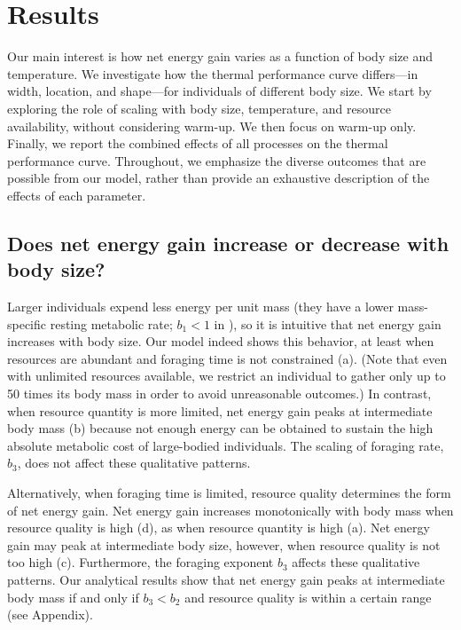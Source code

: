 \section*{Results}

Our main interest is how net energy gain varies as a function of body size and temperature.
We investigate how the thermal performance curve differs---in width, location, and shape---for individuals of different body size.
We start by exploring the role of scaling with body size, temperature, and resource availability, without considering warm-up.
We then focus on warm-up only.
Finally, we report the combined effects of all processes on the thermal performance curve.
Throughout, we emphasize the diverse outcomes that are possible from our model, rather than provide an exhaustive description of the effects of each parameter.


\subsection*{Does net energy gain increase or decrease with body size?}


Larger individuals expend less energy per unit mass (they have a lower mass-specific resting metabolic rate; $b_1 < 1$ in ), so it is intuitive that net energy gain increases with body size.
Our model indeed shows this behavior, at least when resources are abundant and foraging time is not constrained (a).
(Note that even with unlimited resources available, we restrict an individual to gather only up to 50 times its body mass in order to avoid unreasonable outcomes.) %
In contrast, when resource quantity is more limited, net energy gain peaks at intermediate body mass (b) because not enough energy can be obtained to sustain the high absolute metabolic cost of large-bodied individuals.
The scaling of foraging rate, $b_3$, does not affect these qualitative patterns.

Alternatively, when foraging time is limited, resource quality determines the form of net energy gain.
Net energy gain increases monotonically with body mass when resource quality is high (d), as when resource quantity is high (a).
Net energy gain may peak at intermediate body size, however, when resource quality is not too high (c).
Furthermore, the foraging exponent $b_3$ affects these qualitative patterns.
Our analytical results show that net energy gain peaks at intermediate body mass if and only if $b_3 < b_2$ and resource quality is within a certain range (see Appendix).

